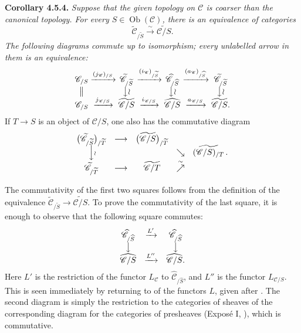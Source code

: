 
\medskip
\noindent{}\textbf{Corollary 4.5.4.}
\textit{Suppose that the given topology on \(\mathscr C\) is coarser than
the canonical topology. For every \(S\in\operatorname{Ob}(\mathscr C)\),
there is an equivalence of categories}
\[
  \widetilde{\mathscr C}_{/\widetilde S}
  \xrightarrow{\ \sim\ }
  \widetilde{\mathscr C/S}.
\]
\textit{The following diagrams commute up to isomorphism; every unlabelled
arrow in them is an equivalence:}
\[
\begin{array}{c@{\;}c@{\;}c@{\;}c@{\;}c@{\;}c@{\;}c}
\mathscr C_{/S}
 &\xrightarrow{(j_{\mathscr C})_{/S}}&
 \widetilde{\mathscr C}_{/\widetilde S}
 &\xrightarrow{(i_{\mathscr C})_{/\widetilde S}}&
 \widehat{\mathscr C}_{/\widehat S}
 &\xrightarrow{(a_{\mathscr C})_{/\widehat S}}&
 \widetilde{\mathscr C}_{/\widetilde S}
 \\
 \big\Vert && \big\downarrow\wr && \big\downarrow\wr && \big\downarrow\wr
 \\
\mathscr C_{/S}
 &\xrightarrow{j_{\mathscr C/S}}&
 \widetilde{\mathscr C/S}
 &\xrightarrow{i_{\mathscr C/S}}&
 \widehat{\mathscr C/S}
 &\xrightarrow{a_{\mathscr C/S}}&
 \widetilde{\mathscr C/S}.
\end{array}
\]
If \(T\to S\) is an object of \(\mathscr C/S\), one also has the
commutative diagram
\[
\begin{array}{ccccc}
 \bigl(\widetilde{\mathscr C}_{/\widetilde S}\bigr)_{/\widetilde T}
 &\longrightarrow&
 \bigl(\widetilde{\mathscr C/S}\bigr)_{/\widetilde T}
 &&\\[-0.15em]
 \Big\downarrow\rlap{\(\scriptstyle\wr\)}
 &&& \searrow &
 \widetilde{(\mathscr C/S)_{/T}}\, .
 \\
 \widetilde{\mathscr C}_{/\widetilde T}
 &\longrightarrow&
 \widetilde{\mathscr C/T}
 &\mathrel{\overset{\sim}{\nearrow}}&
\end{array}
\]

The commutativity of the first two squares follows from the definition of
the equivalence
\(
  \widetilde{\mathscr C}_{/\widetilde S}
  \to\widetilde{\mathscr C/S}
\).
To prove the commutativity of the last square, it is enough to observe that
the following square commutes:
\[
\begin{array}{ccc}
 \widehat{\mathscr C}_{/\widehat S}
 &\xrightarrow{L'}&
 \widehat{\mathscr C}_{/\widehat S}
 \\
 \big\downarrow && \big\downarrow
 \\
 \widehat{\mathscr C/S}
 &\xrightarrow{L''}&
 \widehat{\mathscr C/S}.
\end{array}
\]
Here \(L'\) is the restriction of the functor \(L_{\mathscr C}\) to
\(\widehat{\mathscr C}_{/\widehat S}\), and \(L''\) is the functor
\(L_{\mathscr C/S}\). This is seen immediately by returning to  of the functors \(L\), given after . The second diagram is
simply the restriction to the categories of sheaves of the corresponding
diagram for the categories of presheaves (Expos\'e I, ), which is
commutative.

